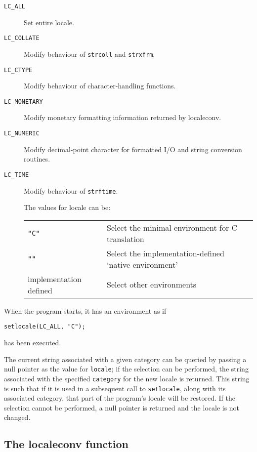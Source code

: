    \begin{description}
   \item[\texttt{LC\_ALL}]
     Set entire locale.
   \item[\texttt{LC\_COLLATE}]
     Modify behaviour of \texttt{strcoll} and \texttt{strxfrm}.
   \item[\texttt{LC\_CTYPE}]
     Modify behaviour of character-handling functions.
   \item[\texttt{LC\_MONETARY}]
     Modify  monetary  formatting  information returned by localeconv.
   \item[\texttt{LC\_NUMERIC}]
     Modify decimal-point character for formatted I/O
     and string conversion routines.
    \item[\texttt{LC\_TIME}] 
     Modify behaviour of \texttt{strftime}.

     The values for locale can be:

     \begin{tabular}{lp{}}
       \hline
       \texttt{"C"} & Select the minimal environment for C translation       \\
       \texttt{""}  & Select the implementation-defined `native environment' \\
       implementation defined & Select other environments                    \\
       \hline
     \end{tabular}
   \end{description}

   When the program starts, it has an environment as if


   \begin{Verbatim}
setlocale(LC_ALL, "C");
\end{Verbatim}

   has been executed.


   The current string associated with a given category  can  be
    queried  by  passing a null pointer as the value for \texttt{locale};
    if the selection can be  performed,  the  string  associated
    with  the specified \texttt{category} for the new locale is returned.
    This string is such that if it is used in a subsequent  call to
    \texttt{setlocale}, along with its associated category, that part
    of the program's locale will be restored.  If the  selection
    cannot  be  performed,  a  null  pointer is returned and the
    locale is not changed.


  

  \subsection{The localeconv function}
   

